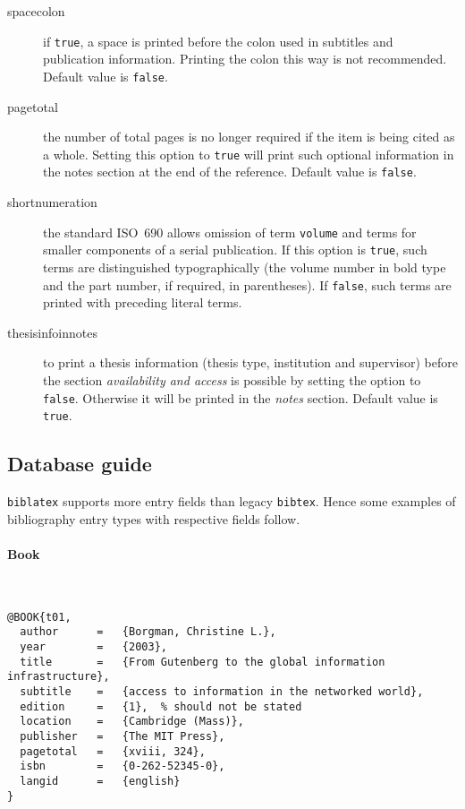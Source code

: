 \documentclass[a4paper,10pt]{ltxdockit}
\def\t|#1|{\texttt{#1}}
\def\c#1{%
\hangpara{3em}{1}%
\fullcite{#1}}
\begin{document}
\begin{description}
  \item[spacecolon] if \t|true|, a space is printed before the colon
  used in subtitles and publication information. Printing the colon this way
  is not recommended. Default value is \t|false|.

  \item[pagetotal] the number of total pages is no longer required if the 
  item is being cited as a whole. Setting this option to \t|true| will print
  such optional information in the notes section at the end of the reference.
  Default value is \t|false|.\label{pkg:opt:iso690:pp}

  \item[shortnumeration] the standard ISO~690 allows omission of term
  \t|volume| and terms for smaller components of a serial publication.
  If this option is \t|true|, such terms are distinguished typographically
  (the volume number in bold type and the part number, if required, in
  parentheses). If \t|false|, such terms are printed with preceding
  literal terms.

  \item[thesisinfoinnotes] to print a thesis information
  (thesis type, institution and supervisor) before the section
  \textit{availability and access} is possible by setting the option
  to \t|false|. Otherwise it will be printed in the \textit{notes} section.
  Default value is \t|true|.
\end{description}


\subsection{Database guide}

\t|biblatex| supports more entry fields than legacy \t|bibtex|. Hence
some examples of bibliography entry types with respective fields follow.


\paragraph{Book} \hfill\\

\c{t01}
\begin{verbatim}
@BOOK{t01,
  author      =   {Borgman, Christine L.}, 
  year        =   {2003},
  title       =   {From Gutenberg to the global information infrastructure}, 
  subtitle    =   {access to information in the networked world},
  edition     =   {1},  % should not be stated
  location    =   {Cambridge (Mass)}, 
  publisher   =   {The MIT Press},
  pagetotal   =   {xviii, 324},
  isbn        =   {0-262-52345-0},
  langid      =   {english}
}
\end{verbatim} 
\end{document}
